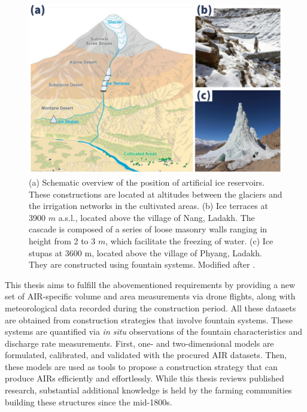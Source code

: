 \begin{figure}[t]
	\centering
	\includegraphics[width=\textwidth]{figs/AIR_forms.jpg}

	\caption{ (a) Schematic overview of the position of artificial ice reservoirs. These constructions are located at
		altitudes between the glaciers and the irrigation networks in the cultivated areas. (b) Ice terraces at 3900
		$m$ \ac{a.s.l.}, located above the village of Nang, Ladakh. The cascade is composed of a series of loose masonry walls
		ranging in height from 2 to 3 $m$, which facilitate the freezing of water. (c) Ice stupas at 3600 m, located
		above the village of Phyang, Ladakh. They are constructed using fountain systems. Modified after \citet{nusserLocalKnowledgeGlobal2016}. }

	\label{fig:AIRforms}
\end{figure}

This thesis aims to fulfill the abovementioned requirements by providing a new set of \ac{AIR}-specific volume
and area measurements via drone flights, along with meteorological data recorded during the construction period.
All these datasets are obtained from construction strategies that involve fountain systems. These systems are
quantified via \textit{in situ} observations of the fountain characteristics and discharge rate measurements.
First, one- and two-dimensional models are formulated, calibrated, and validated with the procured \ac{AIR}
datasets. Then, these models are used as tools to propose a construction strategy that can produce \ac{AIRs}
efficiently and effortlessly. While this thesis reviews published research, substantial additional knowledge is
held by the farming communities building these structures since the mid-1800s.


